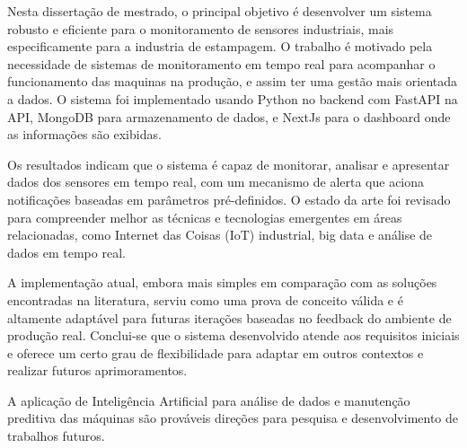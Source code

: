 
Nesta dissertação de mestrado, o principal objetivo é desenvolver um sistema robusto e eficiente para o monitoramento de sensores industriais, mais especificamente para a industria de estampagem. O trabalho é motivado pela necessidade de sistemas de monitoramento em tempo real para acompanhar o funcionamento das maquinas na produção, e assim ter uma gestão mais orientada a dados. O sistema foi implementado usando Python no backend com FastAPI na API, MongoDB para armazenamento de dados, e NextJs para o dashboard onde as informações são exibidas.

Os resultados indicam que o sistema é capaz de monitorar, analisar e apresentar dados dos sensores em tempo real, com um mecanismo de alerta que aciona notificações baseadas em parâmetros pré-definidos. O estado da arte foi revisado para compreender melhor as técnicas e tecnologias emergentes em áreas relacionadas, como Internet das Coisas (IoT) industrial, big data e análise de dados em tempo real.

A implementação atual, embora mais simples em comparação com as soluções encontradas na literatura, serviu como uma prova de conceito válida e é altamente adaptável para futuras iterações baseadas no feedback do ambiente de produção real. Conclui-se que o sistema desenvolvido atende aos requisitos iniciais e oferece um certo grau de flexibilidade para adaptar em outros contextos e realizar futuros aprimoramentos. 

A aplicação de Inteligência Artificial para análise de dados e manutenção preditiva das máquinas são prováveis direções para pesquisa e desenvolvimento de trabalhos futuros. 

\mbox{}\linebreak
{} 

